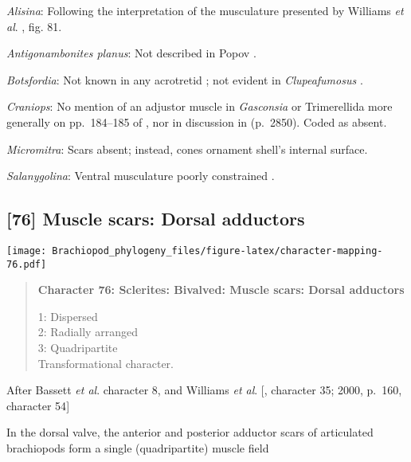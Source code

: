 \documentclass[openany]{book}
\theoremstyle{definition}
\theoremstyle{definition}
\theoremstyle{definition}
\theoremstyle{remark}
\begin{document}
\hypertarget{Alisina-coding-75}{}
\emph{Alisina}: Following the interpretation of the musculature
presented by Williams \emph{et al}.
\citeyearpar{Williams2000LinguliformeaCraniiformea}, fig. 81.

\hypertarget{Antigonambonites_planus-coding-75}{}
\emph{Antigonambonites planus}: Not described in Popov
\citeyearpar{Popov1992TheCambrian}.

\hypertarget{Botsfordia-coding-75}{}
\emph{Botsfordia}: Not known in any acrotretid
\citep{Williams2000LinguliformeaCraniiformea}; not evident in
\emph{Clupeafumosus} \citep{Topper2013Reappraisalof}.

\hypertarget{Craniops-coding-75}{}
\emph{Craniops}: No mention of an adjustor muscle in \emph{Gasconsia} or
Trimerellida more generally on pp.~184--185 of
\citet{Williams2000LinguliformeaCraniiformea}, nor in discussion in
\citet{Williams2007Supplement} (p.~2850). Coded as absent.

\hypertarget{Micromitra-coding-75}{}
\emph{Micromitra}: Scars absent; instead, cones ornament shell's
internal surface.

\hypertarget{Salanygolina-coding-75}{}
\emph{Salanygolina}: Ventral musculature poorly constrained
\citep{Williams2000LinguliformeaCraniiformea, Popov2009Earlyontogeny}.

\subsection*{{[}76{]} Muscle scars: Dorsal
adductors}\label{muscle-scars-dorsal-adductors}

\texttt{[image: Brachiopod\_phylogeny\_files/figure-latex/character-mapping-76.pdf]}

\begin{quote}
\textbf{Character 76: Sclerites: Bivalved: Muscle scars: Dorsal
adductors}

1: Dispersed\\
2: Radially arranged\\
3: Quadripartite\\
Transformational character.
\end{quote}

After Bassett \emph{et al}.
\citeyearpar{Bassett2001Functionalmorphology} character 8, and Williams
\emph{et al}. {[}\citet{Williams1996Asupra}, character 35; 2000, p.~160,
character 54{]}

In the dorsal valve, the anterior and posterior adductor scars of
articulated brachiopods form a single (quadripartite) muscle field
\citep[p.~201]{Williams2000LinguliformeaCraniiformea}
\end{document}
